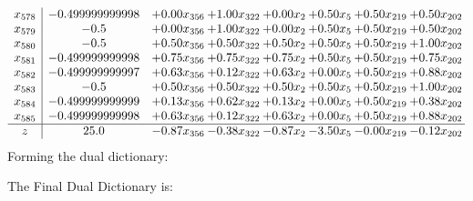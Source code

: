 \documentclass[8pt]{article}
\begin{document}
\[\begin{array}{c| c c@{\hskip 2pt} c@{\hskip 2pt} c@{\hskip 2pt} c@{\hskip 2pt} c@{\hskip 2pt} c@{\hskip 2pt} }
 x_{578}   &  -0.499999999998 & +  0.00 x_{356} & +  1.00 x_{322} & +  0.00 x_{2} & +  0.50 x_{5} & +  0.50 x_{219} & +  0.50 x_{202}\\
 x_{579}   &  -0.5 & +  0.00 x_{356} & +  1.00 x_{322} & +  0.00 x_{2} & +  0.50 x_{5} & +  0.50 x_{219} & +  0.50 x_{202}\\
 x_{580}   &  -0.5 & +  0.50 x_{356} & +  0.50 x_{322} & +  0.50 x_{2} & +  0.50 x_{5} & +  0.50 x_{219} & +  1.00 x_{202}\\
 x_{581}   &  -0.499999999998 & +  0.75 x_{356} & +  0.75 x_{322} & +  0.75 x_{2} & +  0.50 x_{5} & +  0.50 x_{219} & +  0.75 x_{202}\\
 x_{582}   &  -0.499999999997 & +  0.63 x_{356} & +  0.12 x_{322} & +  0.63 x_{2} & +  0.00 x_{5} & +  0.50 x_{219} & +  0.88 x_{202}\\
 x_{583}   &  -0.5 & +  0.50 x_{356} & +  0.50 x_{322} & +  0.50 x_{2} & +  0.50 x_{5} & +  0.50 x_{219} & +  1.00 x_{202}\\
 x_{584}   &  -0.499999999999 & +  0.13 x_{356} & +  0.62 x_{322} & +  0.13 x_{2} & +  0.00 x_{5} & +  0.50 x_{219} & +  0.38 x_{202}\\
 x_{585}   &  -0.499999999998 & +  0.63 x_{356} & +  0.12 x_{322} & +  0.63 x_{2} & +  0.00 x_{5} & +  0.50 x_{219} & +  0.88 x_{202}\\
\hline
z    &  25.0 & -0.87 x_{356} & -0.38 x_{322} & -0.87 x_{2} & -3.50 x_{5} & -0.00 x_{219} & -0.12 x_{202}\\
\end{array}\]
Forming the dual dictionary:

The Final Dual Dictionary is: 
\end{document}
